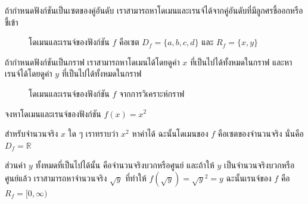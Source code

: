 \begin{frame}
ถ้ากำหนดฟังก์ชันเป็นเซตของคู่อันดับ เราสามารถหาโดเมนและเรนจ์ได้จากคู่อันดับที่มีลูกศรชี้ออกหรือชี้เข้า

\begin{figure}[h!]
\centering
{}
\caption{โดเมนและเรนจ์ของฟังก์ชัน $f$ คือเซต $D_f = \{a,b,c,d\}$ และ $R_f = \{x,y\}$}
\end{figure}
\end{frame}

\begin{frame}
ถ้ากำหนดฟังก์ชันเป็นกราฟ เราสามารถหาโดเมนได้โดยดูค่า $x$ ที่เป็นไปได้ทั้งหมดในกราฟ และหาเรนจ์ได้โดยดูค่า $y$ ที่เป็นไปได้ทั้งหมดในกราฟ

\begin{figure}[h!]
\centering
{}
\caption{โดเมนและเรนจ์ของฟังก์ชัน $f$ จากการวิเคราะห์กราฟ}
\end{figure}
\end{frame}


\begin{frame}[t]
\begin{ex}
จงหาโดเมนและเรนจ์ของฟังก์ชัน $f(x) = x^2$
\end{ex}
\begin{sol}
สำหรับจำนวนจริง $x$ ใด ๆ เราทราบว่า $x^2$ หาค่าได้ \pa ฉะนั้นโดเมนของ $f$ คือเซตของจำนวนจริง \pa นั่นคือ $D_f = \mathbb{R}$ \pa

ส่วนค่า $y$ ทั้งหมดที่เป็นไปได้นั้น \pa คือจำนวนจริงบวกหรือศูนย์ \pa และถ้าให้ $y$ เป็นจำนวนจริงบวกหรือศูนย์แล้ว เราสามารถหาจำนวนจริง $\sqrt{y}$ \pa ที่ทำให้ $f(\sqrt{y}) = \sqrt{y}^2 = y$ \pa ฉะนั้นเรนจ์ของ $f$ คือ $R_f = [0 ,\infty)$
\end{sol}
\end{frame}


